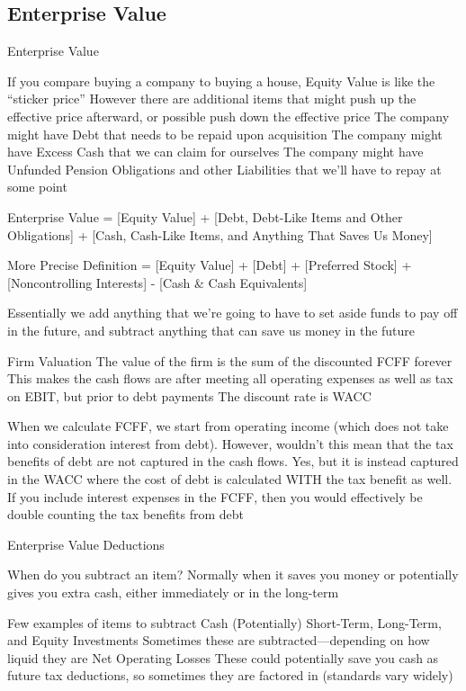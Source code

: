 \documentclass[10pt]{article}
\begin{document}
  \subsection{Enterprise Value}

    \begin{core}{Enterprise Value}

      If you compare buying a company to buying a house, Equity Value is like the “sticker price”
      However there are additional items that might push up the effective price afterward, or possible push down the effective price
      The company might have Debt that needs to be repaid upon acquisition
      The company might have Excess Cash that we can claim for ourselves
      The company might have Unfunded Pension Obligations and other Liabilities that we’ll have to repay at some point

      Enterprise Value
      = [Equity Value] +
      [Debt, Debt-Like Items and Other Obligations] +
      [Cash, Cash-Like Items, and Anything That Saves Us Money]

      More Precise Definition = [Equity Value] + [Debt] + [Preferred Stock] + [Noncontrolling Interests] - [Cash & Cash Equivalents]

      Essentially we add anything that we’re going to have to set aside funds to pay off in the future, and subtract anything that can save us money in the future

      Firm Valuation
      The value of the firm is the sum of the discounted FCFF forever
      This makes the cash flows are after meeting all operating expenses as well as tax on EBIT, but prior to debt payments
      The discount rate is WACC

      When we calculate FCFF, we start from operating income (which does not take into consideration interest from debt). However, wouldn’t this mean that the tax benefits of debt are not captured in the cash flows. Yes, but it is instead captured in the WACC where the cost of debt is calculated WITH the tax benefit as well. 
      If you include interest expenses in the FCFF, then you would effectively be double counting the tax benefits from debt

    \end{core}

    \begin{core}{Enterprise Value Deductions}

      When do you subtract an item?
        Normally when it saves you money or potentially gives you extra cash, either immediately or in the long-term

      Few examples of items to subtract
      Cash
      (Potentially) Short-Term, Long-Term, and Equity Investments
      Sometimes these are subtracted—depending on how liquid they are
      Net Operating Losses
      These could potentially save you cash as future tax deductions, so sometimes they are factored in (standards vary widely)

    \end{core}
\end{document}
